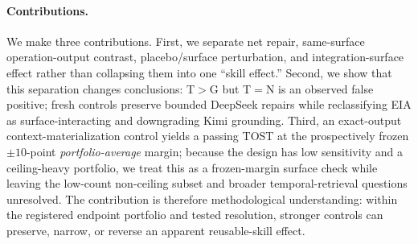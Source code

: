 \paragraph{Contributions.}
We make three contributions. First, we separate net repair, same-surface operation-output contrast, placebo/surface perturbation, and integration-surface effect rather than collapsing them into one ``skill effect.'' Second, we show that this separation changes conclusions: T$>$G but T$=$N is an observed false positive; fresh controls preserve bounded DeepSeek repairs while reclassifying EIA as surface-interacting and downgrading Kimi grounding. Third, an exact-output context-materialization control yields a passing TOST at the prospectively frozen $\pm10$-point \emph{portfolio-average} margin; because the design has low sensitivity and a ceiling-heavy portfolio, we treat this as a frozen-margin surface check while leaving the low-count non-ceiling subset and broader temporal-retrieval questions unresolved. The contribution is therefore methodological understanding: within the registered endpoint portfolio and tested resolution, stronger controls can preserve, narrow, or reverse an apparent reusable-skill effect.
